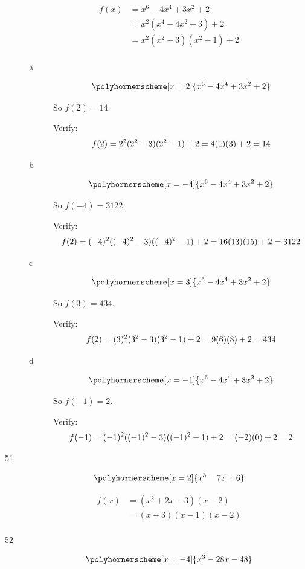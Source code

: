 \documentclass[fleqn,addpoints]{exam}
\begin{document}
\begin{description}
\begin{align*}
  f(x) &= x^6-4x^4+3x^2 + 2 \\
       &= x^2(x^4-4x^2+3) + 2 \\
       &= x^2(x^2-3)(x^2-1) + 2 \\
\end{align*}

\begin{description}
\item[a]
\[
  \polyhornerscheme[x=2]{x^6-4x^4+3x^2+2} \\
\]

So $f(2) = 14$.  

Verify:
\[
  f(2) = 2^2(2^2-3)(2^2-1) + 2 = 4(1)(3) + 2 = 14 \\
\]

\item[b]
\[
  \polyhornerscheme[x=-4]{x^6-4x^4+3x^2+2} \\
\]

So $f(-4) = 3122$.  

Verify:
\[
  f(2) = (-4)^2((-4)^2-3)((-4)^2-1) + 2 = 16(13)(15) + 2 = 3122 \\
\]

\item[c]
\[
  \polyhornerscheme[x=3]{x^6-4x^4+3x^2+2} \\
\]

So $f(3) = 434$.  

Verify:
\[
  f(2) = (3)^2(3^2-3)(3^2-1) + 2 = 9(6)(8) + 2 = 434 \\
\]
 
\item[d]
\[
  \polyhornerscheme[x=-1]{x^6-4x^4+3x^2+2} \\
\]

So $f(-1) = 2$.  

Verify:
\[
  f(-1) = (-1)^2((-1)^2-3)((-1)^2-1) + 2 = (-2)(0) + 2 = 2 \\
\]

\end{description}

\item[51]
\[
  \polyhornerscheme[x=2]{x^3-7x+6} \\
\]

\begin{align*}
  f(x) &= (x^2 +2x -3)(x-2) \\
   &= (x+3)(x-1)(x-2) \\
\end{align*}

\item[52]
\[
  \polyhornerscheme[x=-4]{x^3-28x-48} \\
\]


\end{description}
\end{document}
